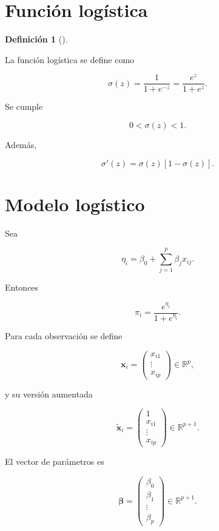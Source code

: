 \documentclass[
  spanish,
  11pt,
  letterpaper,
  DIV=11,
  numbers=noendperiod]{scrreprt}
\theoremstyle{definition}
\newtheorem{definition}{Definición}[chapter]
\theoremstyle{plain}
\theoremstyle{definition}
\theoremstyle{remark}
\begin{document}
\section{Función logística}\label{funciuxf3n-loguxedstica}

\begin{definition}[]\protect\hypertarget{def-funcion-logistica}{}\label{def-funcion-logistica}

La función logística se define como

\[
\sigma(z)
=
\frac{1}{1+e^{-z}}
=
\frac{e^z}{1+e^z}.
\]

\end{definition}

Se cumple

\[
0<\sigma(z)<1.
\]

Además,

\[
\sigma'(z)
=
\sigma(z)\left[1-\sigma(z)\right].
\]

\section{Modelo logístico}\label{modelo-loguxedstico}

Sea

\[
\eta_i
=
\beta_0+
\sum_{j=1}^{p}\beta_j x_{ij}.
\]

Entonces

\[
\pi_i
=
\frac{e^{\eta_i}}{1+e^{\eta_i}}.
\]

Para cada observación se define

\[
\mathbf{x}_i
=
\begin{pmatrix}
x_{i1}\\
\vdots\\
x_{ip}
\end{pmatrix}
\in\mathbb{R}^{p},
\]

y su versión aumentada

\[
\widetilde{\mathbf{x}}_i
=
\begin{pmatrix}
1\\
x_{i1}\\
\vdots\\
x_{ip}
\end{pmatrix}
\in\mathbb{R}^{p+1}.
\]

El vector de parámetros es

\[
\boldsymbol{\beta}
=
\begin{pmatrix}
\beta_0\\
\beta_1\\
\vdots\\
\beta_p
\end{pmatrix}
\in\mathbb{R}^{p+1}.
\]
\end{document}
